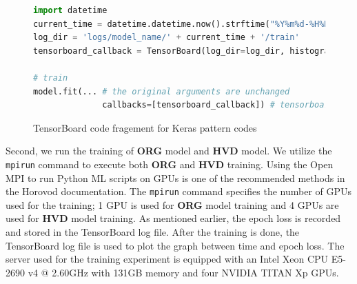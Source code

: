 \begin{figure}[!ht]
  \begin{lstlisting}[language=Python]
import datetime
current_time = datetime.datetime.now().strftime("%Y%m%d-%H%M%S")
log_dir = 'logs/model_name/' + current_time + '/train'
tensorboard_callback = TensorBoard(log_dir=log_dir, histogram_freq=1)

# train
model.fit(... # the original arguments are unchanged
              callbacks=[tensorboard_callback]) # tensorboard_callback is added
  \end{lstlisting}
  \caption{TensorBoard code fragement for Keras pattern codes}
  \label{fig:eval:kerasboard}
\end{figure}

Second, we run the training of \textbf{ORG} model and
\textbf{HVD} model. 
We utilize the {\tt mpirun} command to execute both
\textbf{ORG} and \textbf{HVD} training. 
Using the Open MPI\cite{openmpiorg} to run Python ML scripts on GPUs is one of
the recommended methods in the Horovod documentation\cite{horovodmpi}.
The {\tt mpirun} command specifies the number of
GPUs used for the training; 1 GPU is used for \textbf{ORG} model training  
and 4 GPUs are used for \textbf{HVD} model training. 
As mentioned earlier, the epoch loss is recorded and stored in the
TensorBoard log file.
After the training is done, the TensorBoard log file is used to plot the
graph between time and epoch loss. 
The server used for the training experiment is equipped with an
Intel Xeon CPU E5-2690 v4 @ 2.60GHz with 131GB memory and four 
NVIDIA TITAN Xp GPUs.

